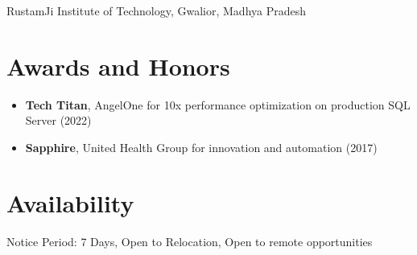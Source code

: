 \documentclass[10pt,a4paper]{article}
\begin{document}
RustamJi Institute of Technology, Gwalior, Madhya Pradesh

\section{Awards and Honors}
\begin{itemize}
  \item \textbf{Tech Titan}, AngelOne for 10x performance optimization on production SQL Server (2022)
  \item \textbf{Sapphire}, United Health Group for innovation and automation (2017)
\end{itemize}

\section{Availability}
Notice Period: 7 Days, Open to Relocation, Open to remote opportunities
\end{document}
